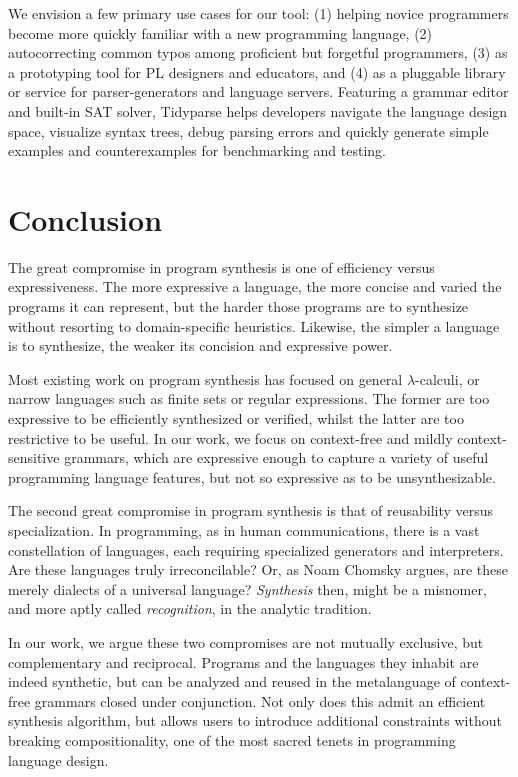 \documentclass[sigplan,review,anonymous,acmsmall]{acmart}\settopmatter{printfolios=false,printccs=false,printacmref=false}
\begin{document}
We envision a few primary use cases for our tool: (1) helping novice programmers become more quickly familiar with a new programming language, (2) autocorrecting common typos among proficient but forgetful programmers, (3) as a prototyping tool for PL designers and educators, and (4) as a pluggable library or service for parser-generators and language servers. Featuring a grammar editor and built-in SAT solver, Tidyparse helps developers navigate the language design space, visualize syntax trees, debug parsing errors and quickly generate simple examples and counterexamples for benchmarking and testing.

\section{Conclusion}\label{sec:conclusion}


The great compromise in program synthesis is one of efficiency versus expressiveness. The more expressive a language, the more concise and varied the programs it can represent, but the harder those programs are to synthesize without resorting to domain-specific heuristics. Likewise, the simpler a language is to synthesize, the weaker its concision and expressive power.

Most existing work on program synthesis has focused on general $\lambda$-calculi, or narrow languages such as finite sets or regular expressions. The former are too expressive to be efficiently synthesized or verified, whilst the latter are too restrictive to be useful. In our work, we focus on context-free and mildly context-sensitive grammars, which are expressive enough to capture a variety of useful programming language features, but not so expressive as to be unsynthesizable.

The second great compromise in program synthesis is that of reusability versus specialization. In programming, as in human communications, there is a vast constellation of languages, each requiring specialized generators and interpreters. Are these languages truly irreconcilable? Or, as Noam Chomsky argues, are these merely dialects of a universal language? \textit{Synthesis} then, might be a misnomer, and more aptly called \textit{recognition}, in the analytic tradition.

In our work, we argue these two compromises are not mutually exclusive, but complementary and reciprocal. Programs and the languages they inhabit are indeed synthetic, but can be analyzed and reused in the metalanguage of context-free grammars closed under conjunction. Not only does this admit an efficient synthesis algorithm, but allows users to introduce additional constraints without breaking compositionality, one of the most sacred tenets in programming language design.
\end{document}
